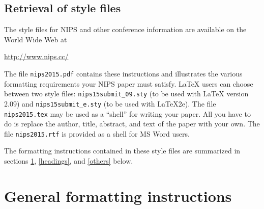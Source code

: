 \documentclass{article} %
\begin{document}
\subsection{Retrieval of style files}

The style files for NIPS and other conference information are available on the World Wide Web at
\begin{center}
   \url{http://www.nips.cc/}
\end{center}
The file \verb+nips2015.pdf+ contains these 
instructions and illustrates the
various formatting requirements your NIPS paper must satisfy. \LaTeX{}
users can choose between two style files:
\verb+nips15submit_09.sty+ (to be used with \LaTeX{} version 2.09) and
\verb+nips15submit_e.sty+ (to be used with \LaTeX{}2e). The file
\verb+nips2015.tex+ may be used as a ``shell'' for writing your paper. All you
have to do is replace the author, title, abstract, and text of the paper with
your own. The file
\verb+nips2015.rtf+ is provided as a shell for MS Word users.

The formatting instructions contained in these style files are summarized in
sections \ref{gen_inst}, \ref{headings}, and \ref{others} below.




\section{General formatting instructions}
\label{gen_inst}
\end{document}

